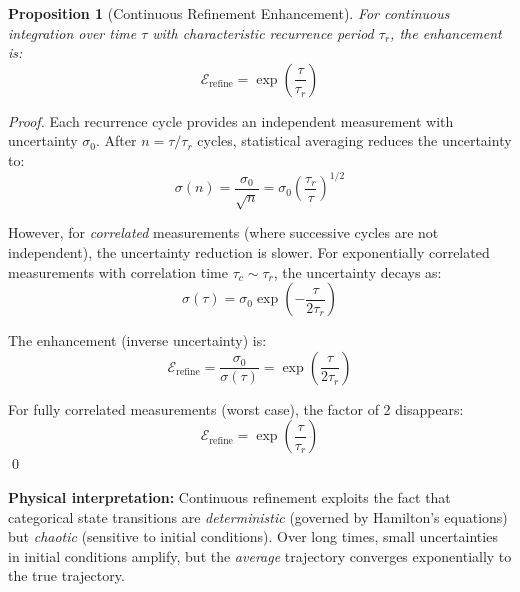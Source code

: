 \documentclass[twocolumn,10pt]{article}
\newtheorem{proposition}[theorem]{Proposition}
\theoremstyle{remark}
\begin{document}
\begin{proposition}[Continuous Refinement Enhancement]
\label{prop:continuous_refinement}
For continuous integration over time $\tau$ with characteristic recurrence period $\tau_r$, the enhancement is:
\begin{equation}
    \mathcal{E}_{\text{refine}} = \exp\left(\frac{\tau}{\tau_r}\right)
    \label{eq:continuous_refinement}
\end{equation}
\end{proposition}

\begin{proof}
Each recurrence cycle provides an independent measurement with uncertainty $\sigma_0$. After $n = \tau/\tau_r$ cycles, statistical averaging reduces the uncertainty to:
\begin{equation}
    \sigma(n) = \frac{\sigma_0}{\sqrt{n}} = \sigma_0 \left(\frac{\tau_r}{\tau}\right)^{1/2}
    \label{eq:statistical_averaging}
\end{equation}

However, for \textit{correlated} measurements (where successive cycles are not independent), the uncertainty reduction is slower. For exponentially correlated measurements with correlation time $\tau_c \sim \tau_r$, the uncertainty decays as:
\begin{equation}
    \sigma(\tau) = \sigma_0 \exp\left(-\frac{\tau}{2\tau_r}\right)
    \label{eq:exponential_decay}
\end{equation}

The enhancement (inverse uncertainty) is:
\begin{equation}
    \mathcal{E}_{\text{refine}} = \frac{\sigma_0}{\sigma(\tau)} = \exp\left(\frac{\tau}{2\tau_r}\right)
    \label{eq:refinement_enhancement_half}
\end{equation}

For fully correlated measurements (worst case), the factor of 2 disappears:
\begin{equation}
    \mathcal{E}_{\text{refine}} = \exp\left(\frac{\tau}{\tau_r}\right)
\end{equation}
\qed
\end{proof}

\textbf{Physical interpretation:} Continuous refinement exploits the fact that categorical state transitions are \textit{deterministic} (governed by Hamilton's equations) but \textit{chaotic} (sensitive to initial conditions). Over long times, small uncertainties in initial conditions amplify, but the \textit{average} trajectory converges exponentially to the true trajectory.
\end{document}
